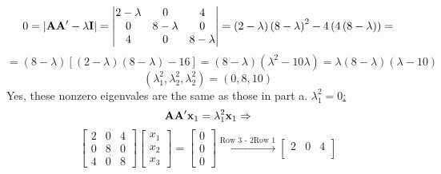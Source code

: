 \begin{enumerate}[label=(\alph*)]
            \[
                0 = \left|\bold{A}\bold{A}^\prime - \lambda\bold{I}\right|
                =
                \left|
                \begin{matrix}
                    2 - \lambda & 0 & 4 \\
                    0 & 8 - \lambda & 0 \\
                    4 & 0 & 8 - \lambda
                \end{matrix}
                \right|
                =
                \left(2 - \lambda\right){\left(8 - \lambda\right)}^2 - 4\left(4\left(8 - \lambda\right)\right)
                =
            \]
            \[
                =
                \left(8 - \lambda\right)
                \left[\left(2 - \lambda\right){\left(8 - \lambda\right)} - 16\right]
                =
                \left(8 - \lambda\right)
                \left(\lambda^2 - 10\lambda\right)
                =
                \lambda\left(8 - \lambda\right)\left(\lambda - 10\right)
            \]
            \[
                \left(\lambda_1^2, \lambda_2^2, \lambda_2^2\right)
                =
                \left(0, 8, 10\right)
            \]
            Yes, these nonzero eigenvales are the same as those in part a.
            \newline
            \underline{$\lambda_1^2 = 0$:}
            \[
                \bold{A}\bold{A}^\prime\bold{x}_1=\lambda_1^2\bold{x}_1
                \Rightarrow
            \]
            \[
                \begin{bmatrix}
                    2 & 0 & 4 \\
                    0 & 8 & 0 \\
                    4 & 0 & 8
                \end{bmatrix}
                \begin{bmatrix}
                    x_1 \\
                    x_2 \\
                    x_3
                \end{bmatrix}
                =
                \begin{bmatrix}
                    0 \\
                    0 \\
                    0
                \end{bmatrix}
                \overset{\text{Row 3 - 2Row 1}}{\longrightarrow}
                \begin{bmatrix}
                    2 & 0 & 4 \\

\end{bmatrix}\]
\end{enumerate}
